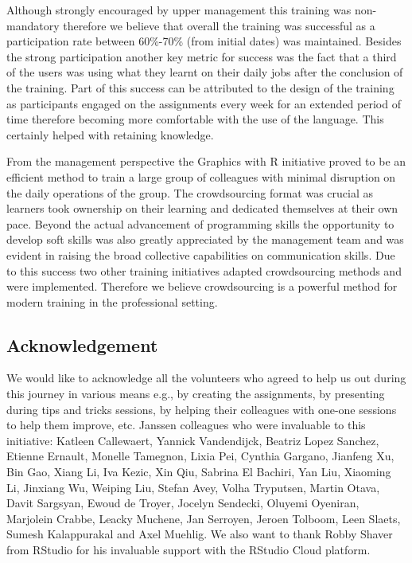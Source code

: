 Although strongly encouraged by upper management this training was
non-mandatory therefore we believe that overall the training was
successful as a participation rate between 60\%-70\% (from initial
dates) was maintained. Besides the strong participation another key
metric for success was the fact that a third of the users was using what
they learnt on their daily jobs after the conclusion of the training.
Part of this success can be attributed to the design of the training as
participants engaged on the assignments every week for an extended
period of time therefore becoming more comfortable with the use of the
language. This certainly helped with retaining knowledge.

From the management perspective the Graphics with R initiative proved to
be an efficient method to train a large group of colleagues with minimal
disruption on the daily operations of the group. The crowdsourcing
format was crucial as learners took ownership on their learning and
dedicated themselves at their own pace. Beyond the actual advancement of
programming skills the opportunity to develop soft skills was also
greatly appreciated by the management team and was evident in raising
the broad collective capabilities on communication skills. Due to this
success two other training initiatives adapted crowdsourcing methods and
were implemented. Therefore we believe crowdsourcing is a powerful
method for modern training in the professional setting.

\hypertarget{acknowledgement}{%
\subsection{Acknowledgement}\label{acknowledgement}}

We would like to acknowledge all the volunteers who agreed to help us
out during this journey in various means e.g., by creating the
assignments, by presenting during tips and tricks sessions, by helping
their colleagues with one-one sessions to help them improve, etc.
Janssen colleagues who were invaluable to this initiative: Katleen
Callewaert, Yannick Vandendijck, Beatriz Lopez Sanchez, Etienne Ernault,
Monelle Tamegnon, Lixia Pei, Cynthia Gargano, Jianfeng Xu, Bin Gao,
Xiang Li, Iva Kezic, Xin Qiu, Sabrina El Bachiri, Yan Liu, Xiaoming Li,
Jinxiang Wu, Weiping Liu, Stefan Avey, Volha Tryputsen, Martin Otava,
Davit Sargsyan, Ewoud de Troyer, Jocelyn Sendecki, Oluyemi Oyeniran,
Marjolein Crabbe, Leacky Muchene, Jan Serroyen, Jeroen Tolboom, Leen
Slaets, Sumesh Kalappurakal and Axel Muehlig. We also want to thank
Robby Shaver from RStudio for his invaluable support with the RStudio
Cloud platform.


